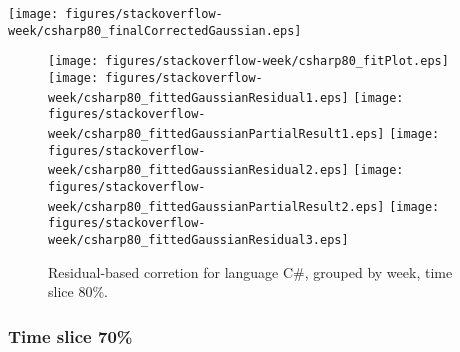 \begin{center}
{\texttt{[image: figures/stackoverflow-week/csharp80\_finalCorrectedGaussian.eps]}}
\end{center}

\FloatBarrier

\begin{figure}[t]
\centering
{}
{\texttt{[image: figures/stackoverflow-week/csharp80\_fitPlot.eps]}}
{\texttt{[image: figures/stackoverflow-week/csharp80\_fittedGaussianResidual1.eps]}}
{\texttt{[image: figures/stackoverflow-week/csharp80\_fittedGaussianPartialResult1.eps]}}
{\texttt{[image: figures/stackoverflow-week/csharp80\_fittedGaussianResidual2.eps]}}
{\texttt{[image: figures/stackoverflow-week/csharp80\_fittedGaussianPartialResult2.eps]}}
{\texttt{[image: figures/stackoverflow-week/csharp80\_fittedGaussianResidual3.eps]}}
\caption{Residual-based corretion for language C\#, grouped by week, time slice 80\%.}
\end{figure}


\FloatBarrier


\subsubsection{Time slice 70\%}

